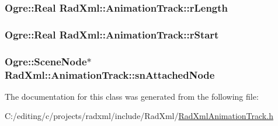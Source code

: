 \hypertarget{class_rad_xml_1_1_animation_track_a1f9d1c712054f85cba20dd4567c15dc4}{
\subsubsection[{r\-Length}]{\setlength{\rightskip}{0pt plus 5cm}Ogre\-::\-Real Rad\-Xml\-::\-Animation\-Track\-::r\-Length\hspace{0.3cm}{\ttfamily [protected]}}}\label{class_rad_xml_1_1_animation_track_a1f9d1c712054f85cba20dd4567c15dc4}
\hypertarget{class_rad_xml_1_1_animation_track_acba15b201ccc5d3df7e418528b3f6bec}{
\subsubsection[{r\-Start}]{\setlength{\rightskip}{0pt plus 5cm}Ogre\-::\-Real Rad\-Xml\-::\-Animation\-Track\-::r\-Start\hspace{0.3cm}{\ttfamily [protected]}}}\label{class_rad_xml_1_1_animation_track_acba15b201ccc5d3df7e418528b3f6bec}
\hypertarget{class_rad_xml_1_1_animation_track_ab33a825510229a825ee70e04e98394b4}{
\subsubsection[{sn\-Attached\-Node}]{\setlength{\rightskip}{0pt plus 5cm}Ogre\-::\-Scene\-Node$\ast$ Rad\-Xml\-::\-Animation\-Track\-::sn\-Attached\-Node\hspace{0.3cm}{\ttfamily [protected]}}}\label{class_rad_xml_1_1_animation_track_ab33a825510229a825ee70e04e98394b4}


The documentation for this class was generated from the following file\-:\begin{DoxyCompactItemize}
\item 
C\-:/editing/c/projects/radxml/include/\-Rad\-Xml/\hyperlink{_rad_xml_animation_track_8h}{Rad\-Xml\-Animation\-Track.\-h}\end{DoxyCompactItemize}
